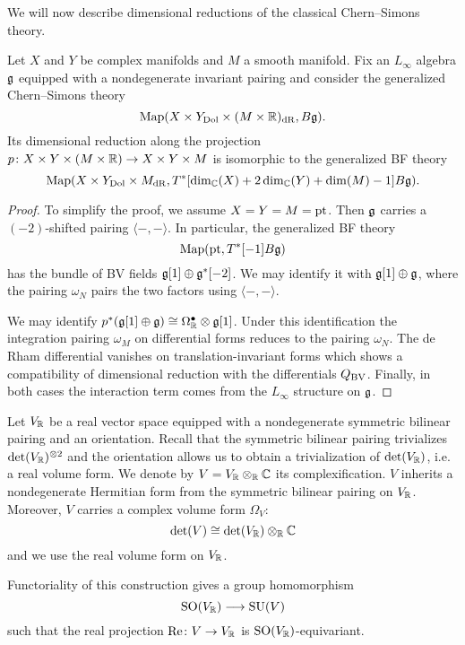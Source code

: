\documentclass[10pt, oneside]{article}
\renewcommand{\Re}{\mathrm{Re}}
\begin{document}
We will now describe dimensional reductions of the classical Chern--Simons theory.

\begin{prop} \label{CS_to_BF_diml_red_prop}
Let $X$ and $Y$ be complex manifolds and $M$ a smooth manifold. Fix an $L_\infty$ algebra $\mathfrak g$ equipped with a nondegenerate invariant pairing and consider the generalized Chern--Simons theory
\[\operatorname{Map}(X\times Y_{\mathrm{Dol}}\times (M\times \mathbb R)_{\mathrm{dR}}, B\mathfrak g).\]
Its dimensional reduction along the projection $p\colon X\times Y\times (M\times \mathbb R)\rightarrow X\times Y\times M$ is isomorphic to the generalized BF theory
\[\operatorname{Map}(X\times Y_{\mathrm{Dol}}\times M_{\mathrm{dR}}, T^*[\dim_\mathbb C(X) + 2\dim_\mathbb C(Y) + \dim(M) - 1] B\mathfrak g).\]
\end{prop}

\begin{proof}
To simplify the proof, we assume $X=Y=M=\operatorname{pt}$. Then $\mathfrak g$ carries a $(-2)$-shifted pairing $\langle-,-\rangle$. In particular, the generalized BF theory
\[\operatorname{Map}(\operatorname{pt}, T^*[-1] B \mathfrak g)\]
has the bundle of BV fields $\mathfrak g[1] \oplus \mathfrak g^*[-2]$. We may identify it with $\mathfrak g[1]\oplus \mathfrak g$, where the pairing $\omega_N$ pairs the two factors using $\langle-,-\rangle$.

We may identify $p^*(\mathfrak g[1]\oplus \mathfrak g)\cong \Omega^\bullet_{\mathbb R}\otimes \mathfrak g[1]$. Under this identification the integration pairing $\omega_M$ on differential forms reduces to the pairing $\omega_N$. The de Rham differential vanishes on translation-invariant forms which shows a compatibility of dimensional reduction with the differentials $Q_{\mathrm{BV}}$. Finally, in both cases the interaction term comes from the $L_\infty$ structure on $\mathfrak g$.
\end{proof}

Let $V_\mathbb R$ be a real vector space equipped with a nondegenerate symmetric bilinear pairing and an orientation. Recall that the symmetric bilinear pairing trivializes $\det(V_\mathbb R)^{\otimes 2}$ and the orientation allows us to obtain a trivialization of $\det(V_\mathbb R)$, i.e. a real volume form. We denote by $V=V_\mathbb R\otimes_{\mathbb R}\mathbb C$ its complexification. $V$ inherits a nondegenerate Hermitian form from the symmetric bilinear pairing on $V_\mathbb R$. Moreover, $V$ carries a complex volume form $\Omega_V$:
\[\det(V)\cong \det(V_\mathbb R)\otimes_{\mathbb R}\mathbb C\]
and we use the real volume form on $V_\mathbb R$.

Functoriality of this construction gives a group homomorphism
\begin{equation}
\mathrm{SO}(V_\mathbb R)\longrightarrow \mathrm{SU}(V)
\label{eq:SOtoSU}
\end{equation}
such that the real projection $\Re\colon V\rightarrow V_\RR$ is $\mathrm{SO}(V_\mathbb R)$-equivariant.
\end{document}
